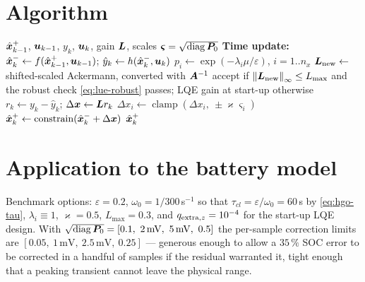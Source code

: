 \section{Algorithm}
\begin{algorithm}[H]
\caption{HGO --- one sampling period}
\begin{algorithmic}[1]
\Require $\hat{\bm{x}}^{+}_{k-1}$, $\bm{u}_{k-1}$, $y_k$, $\bm{u}_k$, gain $\bm{L}$, scales $\bm{\varsigma}=\sqrt{\operatorname{diag}\bm{P}_0}$
\State \textbf{Time update:} $\hat{\bm{x}}^{-}_k \gets f(\hat{\bm{x}}^{+}_{k-1},\bm{u}_{k-1})$; \quad $\hat{y}_k \gets h(\hat{\bm{x}}^{-}_k,\bm{u}_k)$
  \State $p_i \gets \exp(-\lambda_i\mu/\varepsilon)$, $i=1..n_x$
  \State $\bm{L}_{\mathrm{new}} \gets$ shifted-scaled Ackermann, converted with $\bm{A}^{-1}$
  \State accept if $\left\lVert \bm{L}_{\mathrm{new}} \right\rVert_\infty\le L_{\max}$ and the robust check \eqref{eq:lue-robust} passes; LQE gain at start-up otherwise
\EndIf
\State $r_k \gets y_k-\hat{y}_k$; \quad $\Delta\bm{x} \gets \bm{L} r_k$
 \State $\Delta x_i \gets \operatorname{clamp}(\Delta x_i,\ \pm\varkappa\varsigma_i)$  \EndFor
\State $\hat{\bm{x}}^{+}_k \gets \operatorname{constrain}(\hat{\bm{x}}^{-}_k + \Delta\bm{x})$
\Ensure $\hat{\bm{x}}^{+}_k$
\end{algorithmic}
\end{algorithm}

\section{Application to the battery model}
Benchmark options: $\varepsilon = 0.2$, $\omega_0 = 1/300$\,s$^{-1}$ so that
$\tau_{cl} = \varepsilon/\omega_0 = 60$\,s by \eqref{eq:hgo-tau}, $\lambda_i\equiv1$,
$\varkappa = 0.5$, $L_{\max}=0.3$, and $q_{\text{extra},z}=10^{-4}$ for the start-up LQE
design.  With $\sqrt{\diag\mP_0} = [0.1,\ 2\,\mathrm{mV},\ 5\,\mathrm{mV},\ 0.5]$ the per-sample
correction limits are $[0.05,\ 1\,\mathrm{mV},\ 2.5\,\mathrm{mV},\ 0.25]$ --- generous enough to
allow a $35\,\%$ SOC error to be corrected in a handful of samples if the residual warranted it,
tight enough that a peaking transient cannot leave the physical range.

